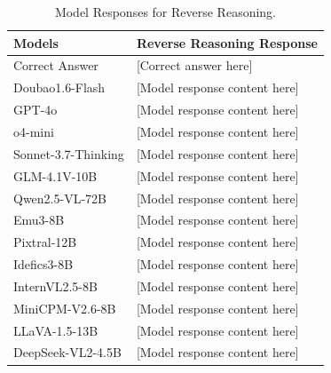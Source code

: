 \begin{table}[h]
\setlength{\tabcolsep}{3mm}
\centering
\small
\begin{tabular}{l|p{12cm}}
\toprule
\textbf{Models} & \textbf{Reverse Reasoning Response} \\
\midrule
Correct Answer & [Correct answer here]\\
\midrule
Doubao1.6-Flash & [Model response content here] \\
\midrule
GPT-4o & [Model response content here] \\
\midrule
o4-mini & [Model response content here] \\
\midrule
Sonnet-3.7-Thinking & [Model response content here] \\
\midrule
GLM-4.1V-10B & [Model response content here] \\
\midrule
Qwen2.5-VL-72B & [Model response content here] \\
Emu3-8B & [Model response content here] \\
Pixtral-12B & [Model response content here] \\
Idefics3-8B & [Model response content here] \\
InternVL2.5-8B & [Model response content here] \\
MiniCPM-V2.6-8B & [Model response content here] \\
LLaVA-1.5-13B & [Model response content here] \\
DeepSeek-VL2-4.5B & [Model response content here] \\
\bottomrule
\end{tabular}
\begin{center}
\caption{Model Responses for Reverse Reasoning.}
\end{center}
\label{tab:task2_responses}
\end{table}

